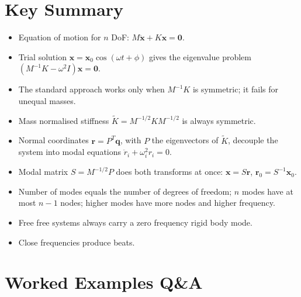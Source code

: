 \documentclass[10pt,a4paper]{article}
\begin{document}

\section{Key Summary}
\begin{itemize}
  \item Equation of motion for $n$ DoF: $M\ddot{\mathbf{x}} + K\mathbf{x} = \mathbf{0}$.
  \item Trial solution $\mathbf{x} = \mathbf{x}_0\cos(\omega t + \phi)$ gives the eigenvalue problem $(M^{-1}K - \omega^2 I)\mathbf{x} = \mathbf{0}$.
  \item The standard approach works only when $M^{-1}K$ is symmetric; it fails for unequal masses.
  \item Mass normalised stiffness $\widetilde{K} = M^{-1/2}K M^{-1/2}$ is always symmetric.
  \item Normal coordinates $\mathbf{r} = P^{T}\mathbf{q}$, with $P$ the eigenvectors of $\widetilde{K}$, decouple the system into modal equations $\ddot{r}_i + \omega_i^2 r_i = 0$.
  \item Modal matrix $S = M^{-1/2}P$ does both transforms at once: $\mathbf{x} = S\mathbf{r}$, $\mathbf{r}_0 = S^{-1}\mathbf{x}_0$.
  \item Number of modes equals the number of degrees of freedom; $n$ modes have at most $n-1$ nodes; higher modes have more nodes and higher frequency.
  \item Free free systems always carry a zero frequency rigid body mode.
  \item Close frequencies produce beats.
\end{itemize}

\section{Worked Examples Q\&A}
\end{document}
